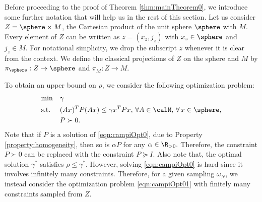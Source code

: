 

Before proceeding to the proof of Theorem \ref{thm:mainTheorem0}, we introduce some further notation that will help us in the rest of this section. Let us consider $Z = \sphere \times M$, the Cartesian product of the unit sphere $\sphere$ with $M$. Every element of $Z$ can be written as $z = (x_z, j_z)$ with $x_z \in \sphere$ and $j_z \in M$. For notational simplicity, we drop the subscript $z$ whenever it is clear from the context. We define the classical projections of $Z$ on the sphere and $M$ by $\pi_{\sphere}: Z \to \sphere$ and $\pi_M: Z \to M$.

To obtain an upper bound on $\rho$, we consider the following optimization problem:
\begin{equation}%
\begin{aligned}
& \text{min} & & \gamma \\
& \text{s.t.} 
&  & (Ax)^TP(Ax) \leq \gamma x^TPx,\,\forall A \in \calM, \,\forall\, x \in \sphere,\\
& && P \succ 0. \\
\end{aligned}
\end{equation}
Note that if $P$ is a solution of \eqref{eqn:campiOpt0}, due to Property \ref{property:homogeneity}, then so is $\alpha P$ for any $\alpha \in \R_{> 0}.$ Therefore, the constraint $P \succ 0$ can be replaced with the constraint $P \succeq I$. Also note that, the optimal solution $\gamma^*$ satisfies $\rho \leq \gamma^*$. However, solving \eqref{eqn:campiOpt0} is hard since it involves infinitely many constraints. Therefore, for a given sampling $\omega_N$, we instead consider the optimization problem \eqref{eqn:campiOpt01} with finitely many constraints sampled from $Z$.

